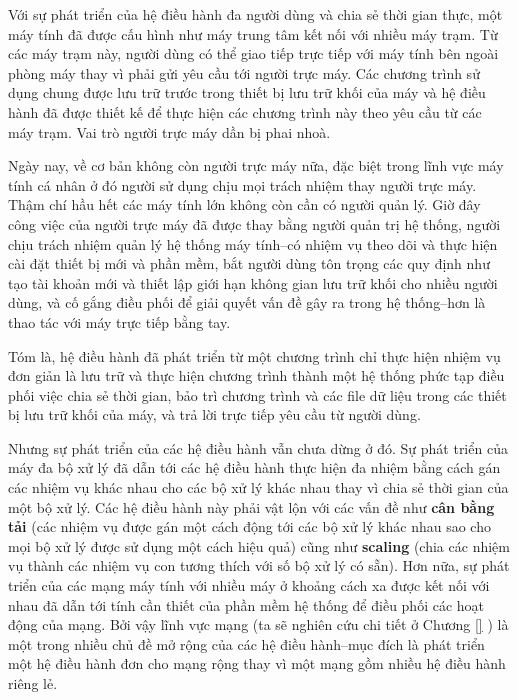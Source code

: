 Với sự phát triển của hệ điều hành đa người dùng và chia sẻ thời gian thực, một máy tính
đã được cấu hình như máy trung tâm kết nối với nhiều máy trạm. Từ các máy trạm này, người
dùng có thể giao tiếp trực tiếp với máy tính bên ngoài phòng máy thay vì phải gửi yêu cầu
tới người trực máy. Các chương trình sử dụng chung được lưu trữ trước trong thiết bị lưu
trữ khối của máy và hệ điều hành đã được thiết kế để thực hiện các chương trình này theo
yêu cầu từ các máy trạm. Vai trò người trực máy dần bị phai nhoà.

Ngày nay, về cơ bản không còn người trực máy nữa, đặc biệt trong lĩnh vực máy tính cá nhân
ở đó người sử dụng chịu mọi trách nhiệm thay người trực máy. Thậm chí hầu hết các máy tính
lớn không còn cần có người quản lý. Giờ đây công việc của người trực máy đã được thay bằng
người quản trị hệ thống, người chịu trách nhiệm quản lý hệ thống máy tính--có nhiệm vụ
theo dõi và thực hiện cài đặt thiết bị mới và phần mềm, bắt người dùng tôn trọng các quy
định như tạo tài khoản mới và thiết lập giới hạn không gian lưu trữ khối cho nhiều người
dùng, và cố gắng điều phối để giải quyết vấn đề gây ra trong hệ thống--hơn là thao tác với
máy trực tiếp bằng tay.

Tóm là, hệ điều hành đã phát triển từ một chương trình chỉ thực hiện nhiệm vụ đơn giản là
lưu trữ và thực hiện chương trình thành một hệ thống phức tạp điều phối việc chia sẻ thời
gian, bảo trì chương trình và các file dữ liệu trong các thiết bị lưu trữ khối của máy, và
trả lời trực tiếp yêu cầu từ người dùng.
 
Nhưng sự phát triển của các hệ điều hành vẫn chưa dừng ở đó. Sự phát triển của máy đa bộ
xử lý đã dẫn tới các hệ điều hành thực hiện đa nhiệm bằng cách gán các nhiệm vụ khác nhau
cho các bộ xử lý khác nhau thay vì chia sẻ thời gian của một bộ xử lý. Các hệ điều hành
này phải vật lộn với các vấn đề như \textbf{cân bằng tải} (các nhiệm vụ được gán một cách
động tới các bộ xử lý khác nhau sao cho mọi bộ xử lý được sử dụng một cách hiệu quả) cũng
như \textbf{scaling} (chia các nhiệm vụ thành các nhiệm vụ con tương thích với số bộ xử lý
có sẵn). Hơn nữa, sự phát triển của các mạng máy tính với nhiều máy ở khoảng cách xa được
kết nối với nhau đã dẫn tới tính cần thiết của phần mềm hệ thống để điều phối các hoạt
động của mạng. Bởi vậy lĩnh vực mạng (ta sẽ nghiên cứu chi tiết ở Chương \ref{} ) là một
trong nhiều chủ đề mở rộng của các hệ điều hành--mục đích là phát triển một hệ điều hành
đơn cho mạng rộng thay vì một mạng gồm nhiều hệ điều hành riêng lẻ.

